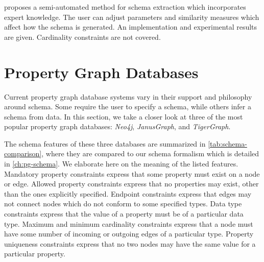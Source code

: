 \documentclass{report}
\theoremstyle{definition}
\begin{document}
\citet{lei2021thesis} proposes a semi-automated method for schema extraction which incorporates expert knowledge. The user can adjust parameters and similarity measures which affect how the schema is generated. An implementation and experimental results are given. Cardinality constraints are not covered.


\section{Property Graph Databases}

Current property graph database systems vary in their support and philosophy around schema. Some require the user to specify a schema, while others infer a schema from data. In this section, we take a closer look at three of the most popular property graph databases: \emph{Neo4j}, \emph{JanusGraph}, and \emph{TigerGraph}.

The schema features of these three databases are summarized in \autoref{tab:schema-comparison}, where they are compared to our schema formalism which is detailed in \autoref{ch:pg-schema}. We elaborate here on the meaning of the listed features. Mandatory property constraints express that some property must exist on a node or edge. Allowed property constraints express that no properties may exist, other than the ones explicitly specified. Endpoint constraints express that edges may not connect nodes which do not conform to some specified types. Data type constraints express that the value of a property must be of a particular data type. Maximum and minimum cardinality constraints express that a node must have some number of incoming or outgoing edges of a particular type. Property uniqueness constraints express that no two nodes may have the same value for a particular property.
\end{document}
